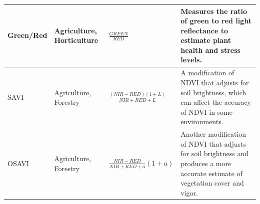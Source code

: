 \documentclass{article}
\begin{document}
{\begin{table}[h]
{\begin{tabular}{|p{2cm}|p{4cm}|p{5cm}|p{4cm}|}
                    \centering \vspace*{1\baselineskip}Green/Red &\centering \vspace*{1\baselineskip} Agriculture, Horticulture &\centering \vspace*{1\baselineskip} $\frac{GREEN}{RED}$ & Measures the ratio of green to red light reflectance to estimate plant health and stress levels. \\ \hline
                    \centering \vspace*{2\baselineskip}SAVI &\centering \vspace*{2\baselineskip} Agriculture, Forestry &\centering \vspace*{1\baselineskip} $\frac{(NIR - RED)(1+L)}{NIR + RED + L}$ & A modification of NDVI that adjusts for soil brightness, which can affect the accuracy of NDVI in some environments. \\ \hline
                    \centering \vspace*{2\baselineskip}OSAVI &\centering \vspace*{2\baselineskip} Agriculture, Forestry &\centering \vspace*{2\baselineskip} $\frac{NIR - RED}{NIR + RED + a}(1 + a)$ & Another modification of NDVI that adjusts for soil brightness and produces a more accurate estimate of vegetation cover and vigor. \\ \hline
                \end{tabular}}
            \end{table}
            
        \newpage
}
\end{document}
